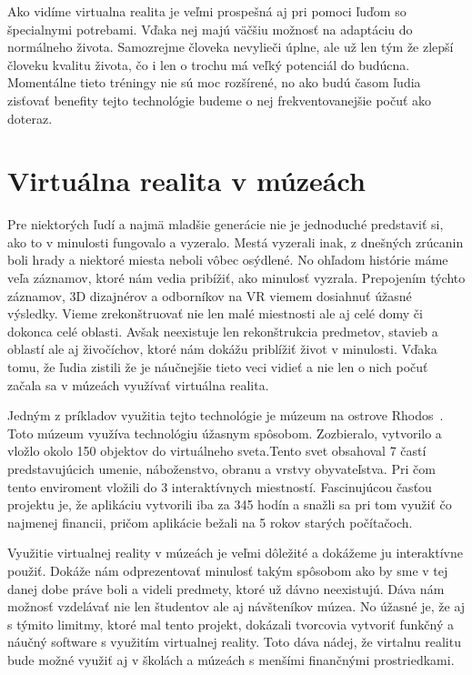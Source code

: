 \documentclass[10pt,twoside,slovak,a4paper]{article}
\begin{document}
Ako vidíme virtualna realita je veľmi prospešná aj pri pomoci ľuďom so špecialnymi potrebami. Vďaka nej majú väčšiu možnosť na adaptáciu do normálneho života. Samozrejme človeka nevylieči úplne, ale už len tým že zlepší človeku kvalitu života, čo i len o trochu má veľký potenciál do budúcna. Momentálne tieto tréningy nie sú moc rozšírené, no ako budú časom ľudia zisťovať benefity tejto technológie budeme o nej frekventovanejšie počuť ako doteraz.   

\section{Virtuálna realita v múzeách} \label{muzea}
Pre niektorých ľudí a najmä mladšie generácie nie je jednoduché predstaviť si, ako to v minulosti fungovalo a vyzeralo. Mestá vyzerali inak, z dnešných zrúcanin boli hrady a niektoré miesta neboli vôbec osýdlené. No ohľadom histórie máme veľa záznamov, ktoré nám vedia pribížiť, ako minulosť vyzrala. Prepojením týchto záznamov, 3D dizajnérov a odborníkov na VR viemem dosiahnuť úžasné výsledky. Vieme zrekonštruovať nie len malé miestnosti ale aj celé domy či dokonca celé oblasti. Avšak neexistuje len rekonštrukcia predmetov, stavieb a oblastí ale aj živočíchov, ktoré nám dokážu priblížiť život v minulosti. Vďaka tomu, že ľudia zistili že je náučnejšie tieto veci vidieť a nie len o nich počuť začala sa v múzeách využívať virtuálna realita.

Jedným z príkladov využitia tejto technológie je múzeum na ostrove Rhodos~\cite{Muzeum}. Toto múzeum využíva technológiu úžasnym spôsobom. Zozbieralo, vytvorilo a vložlo okolo 150 objektov do virtuálneho sveta.Tento svet obsahoval 7 častí predstavujúcich umenie, náboženstvo, obranu a vrstvy obyvateľstva. Pri čom tento enviroment vložili do 3 interaktívnych miestností. Fascinujúcou časťou projektu je, že aplikáciu vytvorili iba za 345 hodín a snažli sa pri tom využiť čo najmenej financii, pričom aplikácie bežali na 5 rokov starých počítačoch.

Využitie virtualnej reality v múzeách je veľmi dôležité a dokážeme ju interaktívne použiť. Dokáže nám odprezentovať minulosť takým spôsobom ako by sme v tej danej dobe práve boli a videli predmety, ktoré už dávno neexistujú.  Dáva nám možnosť vzdelávať nie len študentov ale aj návšteníkov múzea. No úžasné je, že aj s týmito limitmy, ktoré mal tento projekt, dokázali tvorcovia vytvoriť funkčný a náučný software s využitím virtualnej reality. Toto dáva nádej, že virtalnu realitu bude možné využiť aj v školách a múzeách s menšími finančnými prostriedkami.
\end{document}
